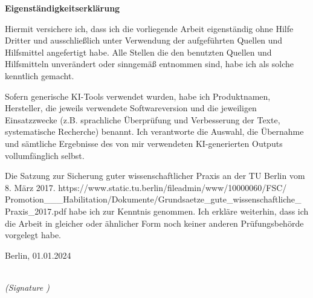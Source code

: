 \newpage

\thispagestyle{empty}
\begin{large}
\noindent
\textbf{Eigenständigkeitserklärung}
\vspace*{1.5cm}

\noindent
Hiermit versichere ich, dass ich die vorliegende Arbeit eigenständig ohne Hilfe Dritter und ausschließlich unter
Verwendung der aufgeführten Quellen und Hilfsmittel angefertigt habe. Alle Stellen die den benutzten Quellen
und Hilfsmitteln unverändert oder sinngemäß entnommen sind, habe ich als solche kenntlich gemacht. 
\newline

\noindent
Sofern generische KI-Tools verwendet wurden, habe ich Produktnamen, Hersteller, die jeweils verwendete
Softwareversion und die jeweiligen Einsatzzwecke (z.B. sprachliche Überprüfung und Verbesserung der Texte,
systematische Recherche) benannt. Ich verantworte die Auswahl, die Übernahme und sämtliche Ergebnisse
des von mir verwendeten KI-generierten Outputs vollumfänglich selbst.
\newline

\noindent
Die Satzung zur Sicherung guter wissenschaftlicher Praxis an der TU Berlin vom 8. März 2017.
https://www.static.tu.berlin/fileadmin/www/10000060/FSC/ \\
Promotion\_\_\_Habilitation/Dokumente/Grundsaetze\_gute\_wissenschaftliche\_ \\
Praxis\_2017.pdf habe ich zur Kenntnis genommen.
Ich erkläre weiterhin, dass ich die Arbeit in gleicher oder ähnlicher Form noch keiner anderen Prüfungsbehörde
vorgelegt habe.
\vspace{2cm}

\noindent
Berlin, 01.01.2024\\ %

\vspace{3cm}

\hspace*{7cm}%
\dotfill\\
\hspace*{8.5cm}%
\textit{(Signature )}

\end{large}
